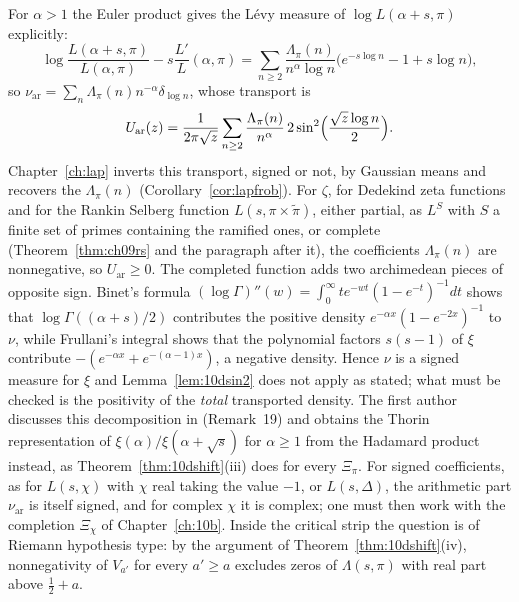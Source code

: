 For $\alpha>1$ the Euler product gives the L\'evy measure of $\log L(\alpha+s,\pi)$ explicitly:
\[
\log\frac{L(\alpha+s,\pi)}{L(\alpha,\pi)}-s\frac{L'}L(\alpha,\pi) = \sum_{n\ge2}\frac{\Lambda_\pi(n)}{n^\alpha\log n}\bigl(e^{-s\log n}-1+s\log n\bigr),
\]
so $\nu_{\mathrm{ar}} = \sum_n\Lambda_\pi(n)n^{-\alpha}\delta_{\log n}$, whose transport is
\[
U_{\mathrm{ar}}(z) = \frac1{2\pi\sqrt z}\sum_{n\ge2}\frac{\Lambda_\pi(n)}{n^\alpha}\,2\sin^2\Bigl(\frac{\sqrt z\log n}2\Bigr).
\]
Chapter~\ref{ch:lap} inverts this transport, signed or not, by Gaussian means and recovers the $\Lambda_\pi(n)$ (Corollary~\ref{cor:lapfrob}). For $\zeta$, for Dedekind zeta functions and for the Rankin Selberg function $L(s,\pi\times\tilde\pi)$, either partial, as $L^S$ with $S$ a finite set of primes containing the ramified ones, or complete (Theorem~\ref{thm:ch09rs} and the paragraph after it), the coefficients $\Lambda_\pi(n)$ are nonnegative, so $U_{\mathrm{ar}}\ge0$. The completed function adds two archimedean pieces of opposite sign. Binet's formula $(\log\Gamma)''(w) = \int_0^\infty te^{-wt}(1-e^{-t})^{-1}dt$ shows that $\log\Gamma((\alpha+s)/2)$ contributes the positive density $e^{-\alpha x}(1-e^{-2x})^{-1}$ to $\nu$, while Frullani's integral shows that the polynomial factors $s(s-1)$ of $\xi$ contribute $-(e^{-\alpha x}+e^{-(\alpha-1)x})$, a negative density. Hence $\nu$ is a signed measure for $\xi$ and Lemma~\ref{lem:10dsin2} does not apply as stated; what must be checked is the positivity of the \emph{total} transported density. The first author discusses this decomposition in \cite{polson2018vdp} (Remark~19) and obtains the Thorin representation of $\xi(\alpha)/\xi(\alpha+\sqrt s)$ for $\alpha\ge1$ from the Hadamard product instead, as Theorem~\ref{thm:10dshift}(iii) does for every $\Xi_\pi$. For signed coefficients, as for $L(s,\chi)$ with $\chi$ real taking the value $-1$, or $L(s,\Delta)$, the arithmetic part $\nu_{\mathrm{ar}}$ is itself signed, and for complex $\chi$ it is complex; one must then work with the completion $\Xi_\chi$ of Chapter~\ref{ch:10b}. Inside the critical strip the question is of Riemann hypothesis type: by the argument of Theorem~\ref{thm:10dshift}(iv), nonnegativity of $V_{a'}$ for every $a'\ge a$ excludes zeros of $\Lambda(s,\pi)$ with real part above $\frac12+a$.

